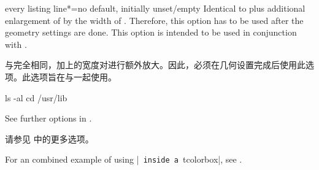 \begin{docTcbKey}{every listing line*}{=}{no default, initially unset/empty}
Identical to  plus additional enlargement
of  by the width of . Therefore, this
option has to be used after the geometry settings are done.
This option is intended to be used in conjunction with .

与完全相同，加上的宽度对进行额外放大。因此，必须在几何设置完成后使用此选项。此选项旨在与一起使用。
\begin{dispExample}

\begin{commandshell}
ls -al
cd /usr/lib
\end{commandshell}
\end{dispExample}
\end{docTcbKey}

See further options in .

请参见  中的更多选项。
\begin{marker}
For an combined example of using |\lstinline| inside a |tcolorbox|, see
.
\end{marker}
